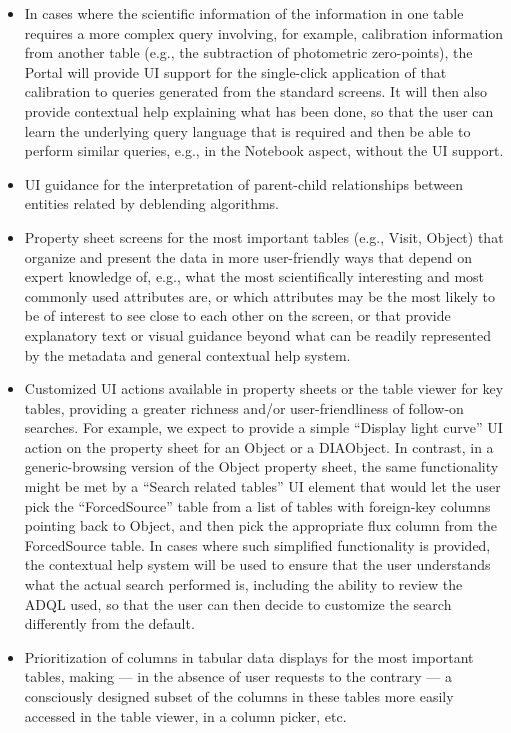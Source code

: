 \begin{itemize}
\item In cases where the scientific information of the information in one table requires a more complex query involving, for example, calibration information from another table (e.g., the subtraction of photometric zero-points), the Portal will provide UI support for the single-click application of that calibration to queries generated from the standard screens.
It will then also provide contextual help explaining what has been done, so that the user can learn the underlying query language that is required and then be able to perform similar queries, e.g., in the Notebook aspect, without the UI support.
\item UI guidance for the interpretation of parent-child relationships between entities related by deblending algorithms.
\item Property sheet screens for the most important tables (e.g., Visit, Object) that organize and present the data in more user-friendly ways that depend on expert knowledge of, e.g., what the most scientifically interesting and most commonly used attributes are, or which attributes may be the most likely to be of interest to see close to each other on the screen, or that provide explanatory text or visual guidance beyond what can be readily represented by the metadata and general contextual help system.
\item Customized UI actions available in property sheets or the table viewer for key tables, providing a greater richness and/or user-friendliness of follow-on searches.
For example, we expect to provide a simple ``Display light curve'' UI action on the property sheet for an Object or a DIAObject.
In contrast, in a generic-browsing version of the Object property sheet, the same functionality might be met by a ``Search related tables'' UI element that would let the user pick the ``ForcedSource'' table from a list of tables with foreign-key columns pointing back to Object, and then pick the appropriate flux column from the ForcedSource table.
In cases where such simplified functionality is provided, the contextual help system will be used to ensure that the user understands what the actual search performed is, including the ability to review the ADQL used, so that the user can then decide to customize the search differently from the default.
\item Prioritization of columns in tabular data displays for the most important tables, making --- in the absence of user requests to the contrary --- a consciously designed subset of the columns in these tables more easily accessed in the table viewer, in a column picker, etc.

\end{itemize}
